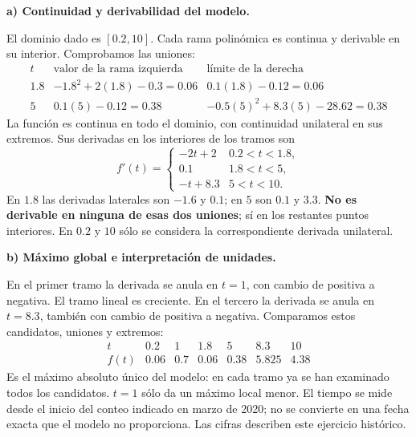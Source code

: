 \textbf{a) Continuidad y derivabilidad del modelo.}\par\nopagebreak[4]
El dominio dado es $[0.2,10]$. Cada rama polinómica es continua y derivable en su interior. Comprobamos las uniones:
\[
\begin{array}{c|rr}
t&\text{valor de la rama izquierda}&\text{límite de la derecha}\\\hline
1.8&-1.8^2+2(1.8)-0.3=0.06&0.1(1.8)-0.12=0.06\\
5&0.1(5)-0.12=0.38&-0.5(5)^2+8.3(5)-28.62=0.38
\end{array}
\]
La función es continua en todo el dominio, con continuidad unilateral en sus extremos. Sus derivadas en los interiores de los tramos son
\[
f'(t)=\begin{cases}-2t+2&0.2<t<1.8,\\0.1&1.8<t<5,\\-t+8.3&5<t<10.\end{cases}
\]
En $1.8$ las derivadas laterales son $-1.6$ y $0.1$; en $5$ son $0.1$ y $3.3$. \textbf{No es derivable en ninguna de esas dos uniones}; sí en los restantes puntos interiores. En $0.2$ y $10$ sólo se considera la correspondiente derivada unilateral.

\textbf{b) Máximo global e interpretación de unidades.}\par\nopagebreak[4]
En el primer tramo la derivada se anula en $t=1$, con cambio de positiva a negativa. El tramo lineal es creciente. En el tercero la derivada se anula en $t=8.3$, también con cambio de positiva a negativa. Comparamos estos candidatos, uniones y extremos:
\[
\begin{array}{c|rrrrrr}
t&0.2&1&1.8&5&8.3&10\\\hline
f(t)&0.06&0.7&0.06&0.38&5.825&4.38
\end{array}
\]
Es el máximo absoluto único del modelo: en cada tramo ya se han examinado todos los candidatos. $t=1$ sólo da un máximo local menor. El tiempo se mide desde el inicio del conteo indicado en marzo de 2020; no se convierte en una fecha exacta que el modelo no proporciona. Las cifras describen este ejercicio histórico.

